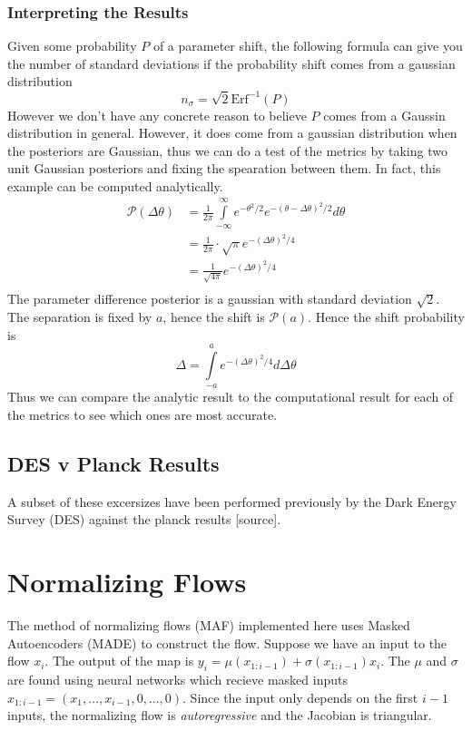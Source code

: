 \subsubsection{Interpreting the Results}
Given some probability $P$ of a parameter shift, the following formula can give you the number of standard deviations if the probability shift comes from a gaussian distribution
\begin{equation}
	n_\sigma = \sqrt{2} \text{Erf}^{-1}(P)
\end{equation}
However we don't have any concrete reason to believe $P$ comes from a Gaussin distribution in general. However, it does come from a gaussian distribution when the posteriors are Gaussian, thus we can do a test of the metrics by taking two unit Gaussian posteriors and fixing the spearation between them. In fact, this example can be computed analytically.
\begin{equation}
    \begin{split}
	\mathcal{P}(\Delta \theta) &= \frac{1}{2\pi} \int\limits_{-\infty}^{\infty} e^{-\theta^2/2} e^{-{(\theta-\Delta\theta)}^2/2}  d\theta \\
				  			   &= \frac{1}{2\pi} \cdot \sqrt{\pi} e^{-{(\Delta\theta)}^2/4}\\
				   			   &= \frac{1}{\sqrt{4\pi}}e^{-{(\Delta\theta)}^2/4}\\
    \end{split}
\end{equation}
The parameter difference posterior is a gaussian with standard deviation $\sqrt{2}$. The separation is fixed by $a$, hence the shift is $\mathcal{P}(a)$. Hence the shift probability is
\begin{equation}
	\Delta = \int\limits_{-a}^{a} e^{-{(\Delta\theta)}^2/4} d\Delta\theta
\end{equation}
Thus we can compare the analytic result to the computational result for each of the metrics to see which ones are most accurate.
\subsection{DES v Planck Results}
A subset of these excersizes have been performed previously by the Dark Energy Survey (DES) against the planck results [source].
\section{Normalizing Flows}
The method of normalizing flows (MAF) implemented here uses Masked Autoencoders (MADE) to construct the flow. 
Suppose we have an input to the flow $x_i$. 
The output of the map is $y_i= \mu(x_{1:i-1})+\sigma(x_{1:i-1})x_i$. 
The $\mu$ and $\sigma$ are found using neural networks which recieve masked inputs $x_{1:i-1}=(x_1,\ldots,x_{i-1},0,\ldots,0)$. 
Since the input only depends on the first $i-1$ inputs, the normalizing flow is \textit{autoregressive} and the Jacobian is triangular.

